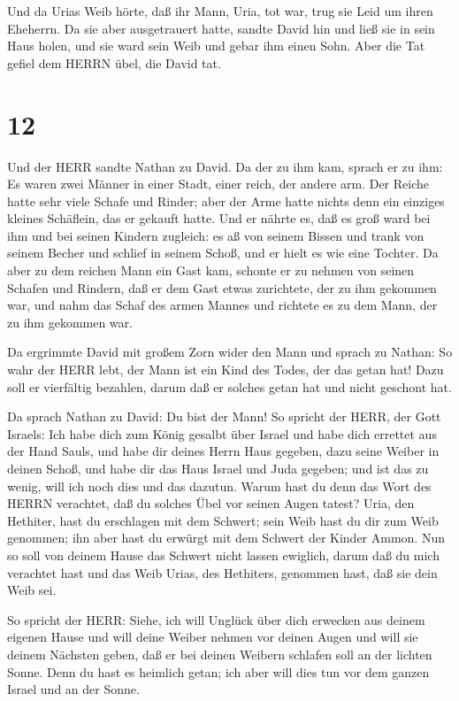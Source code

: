  Und da Urias Weib hörte, daß ihr Mann, Uria, tot war, trug
sie Leid um ihren Eheherrn.  Da sie aber ausgetrauert
hatte, sandte David hin und ließ sie in sein Haus holen, und sie ward
sein Weib und gebar ihm einen Sohn. Aber die Tat gefiel dem HERRN übel,
die David tat.

\hypertarget{section-11}{%
\section{12}\label{section-11}}

 Und der HERR sandte Nathan zu David. Da der zu ihm kam,
sprach er zu ihm: Es waren zwei Männer in einer Stadt, einer reich, der
andere arm.  Der Reiche hatte sehr viele Schafe und Rinder;
 aber der Arme hatte nichts denn ein einziges kleines
Schäflein, das er gekauft hatte. Und er nährte es, daß es groß ward bei
ihm und bei seinen Kindern zugleich: es aß von seinem Bissen und trank
von seinem Becher und schlief in seinem Schoß, und er hielt es wie eine
Tochter.  Da aber zu dem reichen Mann ein Gast kam, schonte
er zu nehmen von seinen Schafen und Rindern, daß er dem Gast etwas
zurichtete, der zu ihm gekommen war, und nahm das Schaf des armen Mannes
und richtete es zu dem Mann, der zu ihm gekommen war.

 Da ergrimmte David mit großem Zorn wider den Mann und
sprach zu Nathan: So wahr der HERR lebt, der Mann ist ein Kind des
Todes, der das getan hat!  Dazu soll er vierfältig bezahlen,
darum daß er solches getan hat und nicht geschont hat.

 Da sprach Nathan zu David: Du bist der Mann! So spricht der
HERR, der Gott Israels: Ich habe dich zum König gesalbt über Israel und
habe dich errettet aus der Hand Sauls,  und habe dir deines
Herrn Haus gegeben, dazu seine Weiber in deinen Schoß, und habe dir das
Haus Israel und Juda gegeben; und ist das zu wenig, will ich noch dies
und das dazutun.  Warum hast du denn das Wort des HERRN
verachtet, daß du solches Übel vor seinen Augen tatest? Uria, den
Hethiter, hast du erschlagen mit dem Schwert; sein Weib hast du dir zum
Weib genommen; ihn aber hast du erwürgt mit dem Schwert der Kinder
Ammon.  Nun so soll von deinem Hause das Schwert nicht
lassen ewiglich, darum daß du mich verachtet hast und das Weib Urias,
des Hethiters, genommen hast, daß sie dein Weib sei.

 So spricht der HERR: Siehe, ich will Unglück über dich
erwecken aus deinem eigenen Hause und will deine Weiber nehmen vor
deinen Augen und will sie deinem Nächsten geben, daß er bei deinen
Weibern schlafen soll an der lichten Sonne.  Denn du hast
es heimlich getan; ich aber will dies tun vor dem ganzen Israel und an
der Sonne.

